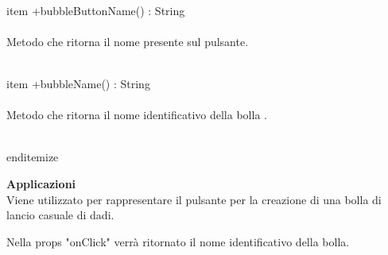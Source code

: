 \\item +bubbleButtonName() : String 
\\\\
Metodo che ritorna il nome presente sul pulsante.

\\item +bubbleName() : String 
\\\\
Metodo che ritorna il nome identificativo della bolla .

\\end{itemize} 


\textbf{Applicazioni}\\
Viene utilizzato per rappresentare il pulsante per la creazione di una bolla di lancio casuale di dadi.

Nella props "onClick" verrà ritornato il nome identificativo della bolla. 


